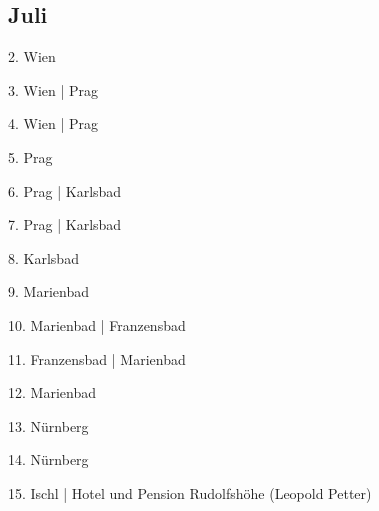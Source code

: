 \documentclass[twoside=false,titlepage=false,open=any, parskip=never, fontsize=10pt, headings=small, chapterprefix=false, appendixprefix=false, DIV=15]{scrbook}
\begin{document}
\begin{multicols}{3}
            \section*{Juli}
            2. Wien\par
            3. Wien | Prag\par
            4. Wien | Prag\par
            5. Prag\par
            6. Prag | Karlsbad\par
            7. Prag | Karlsbad\par
            8. Karlsbad\par
            9. Marienbad\par
            10. Marienbad | Franzensbad\par
            11. Franzensbad | Marienbad\par
            12. Marienbad\par
            13. Nürnberg\par
            14. Nürnberg\par
            15. Ischl | Hotel und Pension Rudolfshöhe (Leopold Petter)\par

\end{multicols}
\end{document}

